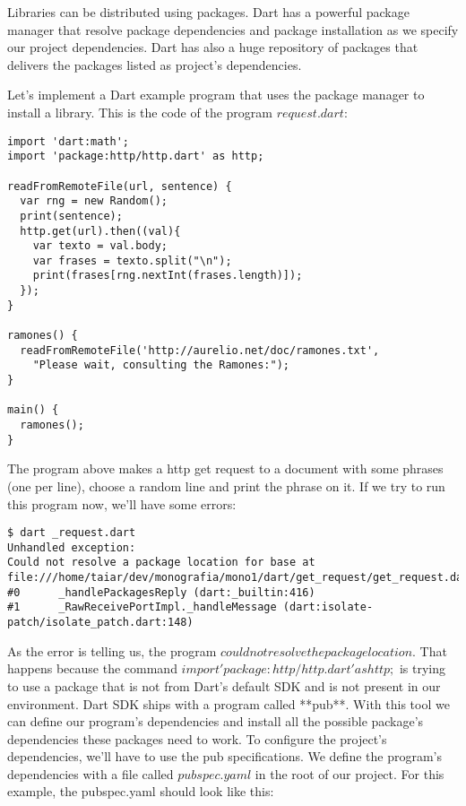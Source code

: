 Libraries can be distributed using packages. Dart has a powerful package
manager that resolve package dependencies and package installation as we
specify our project dependencies. Dart has also a huge repository of packages
\cite{3_17} that delivers the packages listed as project's dependencies.

Let's implement a Dart example program that uses the package manager to install
a library. This is the code of the program $request.dart$:

\begin{lstlisting}[label=dpacl,caption=Dart Package Usage]
import 'dart:math';
import 'package:http/http.dart' as http;

readFromRemoteFile(url, sentence) {
  var rng = new Random();
  print(sentence);
  http.get(url).then((val){
    var texto = val.body;
    var frases = texto.split("\n");
    print(frases[rng.nextInt(frases.length)]);
  });
}

ramones() {
  readFromRemoteFile('http://aurelio.net/doc/ramones.txt',
    "Please wait, consulting the Ramones:");
}

main() {
  ramones();
}
\end{lstlisting}

The program above makes a http get request \cite{3_13}
to a document with some phrases (one per line), choose a random line and print
the phrase on it. If we try to run this program now, we'll have some errors:

\begin{verbatim}
$ dart _request.dart
Unhandled exception:
Could not resolve a package location for base at file:///home/taiar/dev/monografia/mono1/dart/get_request/get_request.dart
#0      _handlePackagesReply (dart:_builtin:416)
#1      _RawReceivePortImpl._handleMessage (dart:isolate-patch/isolate_patch.dart:148)
\end{verbatim}

As the error is telling us, the program $could not resolve the package location$.
That happens because the command $import 'package:http/http.dart' as http;$
is trying to use a package that is not from Dart's default SDK and is not
present in our environment. Dart SDK ships with a program called **pub**. With
this tool we can define our program's dependencies and install all the possible
package's dependencies these packages need to work. To configure the project's 
dependencies, we'll have to use the pub specifications. We define the program's
dependencies with a file called $pubspec.yaml$ in the root of our project. For 
this example, the pubspec.yaml should look like this:

